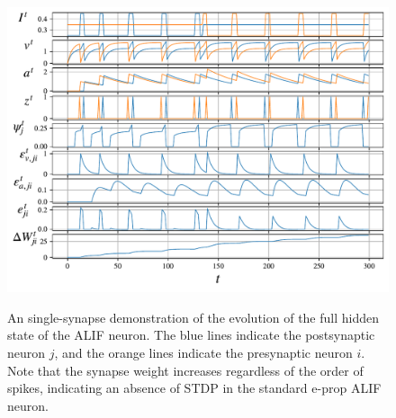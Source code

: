             \begin{figure}[!ht]
                \centering
                \includegraphics[width=\linewidth]{gfx/alif}
                \label{fig:alif}
                \caption{An single-synapse demonstration of the evolution of the full hidden state of the ALIF neuron. The blue lines indicate the postsynaptic neuron $j$, and the orange lines indicate the presynaptic neuron $i$. Note that the synapse weight increases regardless of the order of spikes, indicating an absence of STDP in the standard e-prop ALIF neuron.}
            \end{figure}


